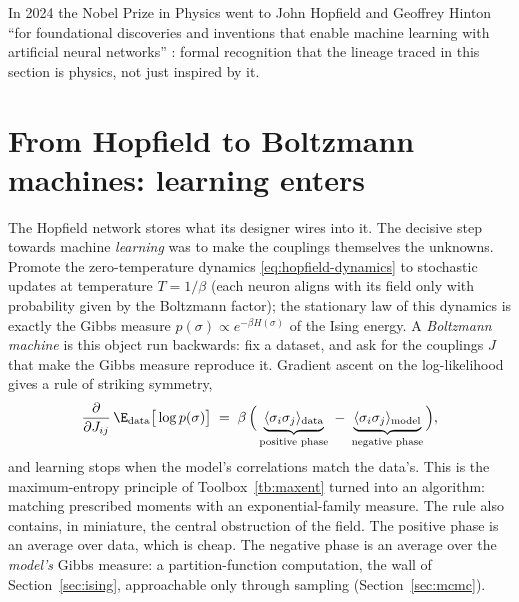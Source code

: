 In 2024 the Nobel Prize in Physics went to John Hopfield and Geoffrey
Hinton ``for foundational discoveries and inventions that enable machine
learning with artificial neural networks'' \citep{nobel2024physics}:
formal recognition that the lineage traced in this section is physics,
not just inspired by it.

\section{From Hopfield to Boltzmann machines: learning enters}
\label{sec:boltzmann-machines}

The Hopfield network stores what its designer wires into it. The decisive
step towards machine \emph{learning} was to make the couplings themselves
the unknowns. Promote the zero-temperature dynamics
\eqref{eq:hopfield-dynamics} to stochastic updates at temperature
$T = 1/\beta$ (each neuron aligns with its field only with probability
given by the Boltzmann factor); the stationary law of this dynamics is
exactly the Gibbs measure $p(\sigma) \propto e^{-\beta H(\sigma)}$ of the
Ising energy. A \emph{Boltzmann machine} \citep{ackley1985learning} is
this object run backwards: fix a dataset, and ask for the couplings $J$
that make the Gibbs measure reproduce it. Gradient ascent on the
log-likelihood gives a rule of striking symmetry,
\begin{equation}
  \frac{\partial}{\partial J_{ij}} \,\E_{\text{data}}\big[\log p(\sigma)\big]
  \;=\; \beta\,\Big(
  \underbrace{\langle \sigma_i \sigma_j \rangle_{\text{data}}}_{\text{positive phase}}
  \;-\;
  \underbrace{\langle \sigma_i \sigma_j \rangle_{\text{model}}}_{\text{negative phase}}
  \Big),
  \label{eq:bm-learning}
\end{equation}
and learning stops when the model's correlations match the data's. This
is the maximum-entropy principle of Toolbox~\ref{tb:maxent} turned into
an algorithm: matching prescribed moments with an exponential-family
measure. The rule also contains, in miniature, the central obstruction of
the field. The positive phase is an average over data, which is cheap.
The negative phase is an average over the \emph{model's} Gibbs measure: a
partition-function computation, the wall of Section~\ref{sec:ising},
approachable only through sampling
(Section~\ref{sec:mcmc}).

